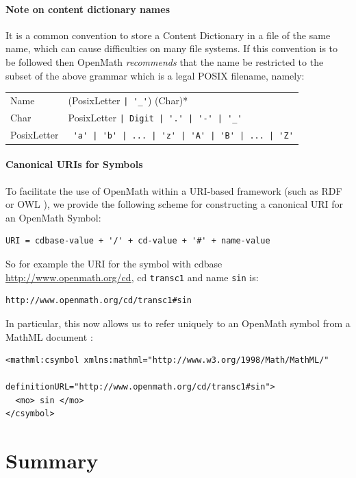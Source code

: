 \documentclass{report}
\def\OM{OpenMath\xspace}
\begin{document}
\paragraph{Note on content dictionary names}

It is a common convention to store a Content Dictionary in a file of
the same name, which can cause difficulties on many file systems.  If
this convention is to be followed then \OM
\emph{recommends} that the name be restricted to the
subset of the above grammar which is a legal POSIX
\cite{POSIX} filename, namely:

\begin{center}
\begin{tabular}{l@{$\longrightarrow$}p{10cm}}
Name & (PosixLetter \lstinline?| '_'?) (Char)*\\
Char &  PosixLetter \lstinline?| Digit | '.' | '-' | '_' ?\\
PosixLetter & \lstinline? 'a' | 'b' | ... | 'z' | 'A' | 'B' | ... | 'Z'?
\end{tabular}
\end{center}


\paragraph{Canonical URIs for Symbols}

To facilitate the use of \OM within a URI-based framework (such as RDF
\cite{rdf} or OWL \cite{owl}), we provide the
following scheme for constructing a canonical URI
for an \OM Symbol:
\begin{lstlisting}
URI = cdbase-value + '/' + cd-value + '#' + name-value
\end{lstlisting}
So for example the URI for the symbol with cdbase \url{http://www.openmath.org/cd}, cd
\lstinline|transc1| and name \lstinline|sin| is:
\begin{lstlisting}
http://www.openmath.org/cd/transc1#sin
\end{lstlisting}
In particular, this now allows us to refer uniquely to an \OM symbol from a
MathML document \cite{MathML_2003}:
\begin{lstlisting}
<mathml:csymbol xmlns:mathml="http://www.w3.org/1998/Math/MathML/"
                definitionURL="http://www.openmath.org/cd/transc1#sin">
  <mo> sin </mo> 
</csymbol>
\end{lstlisting}



\section{Summary}\label{sec_summary}
\end{document}
